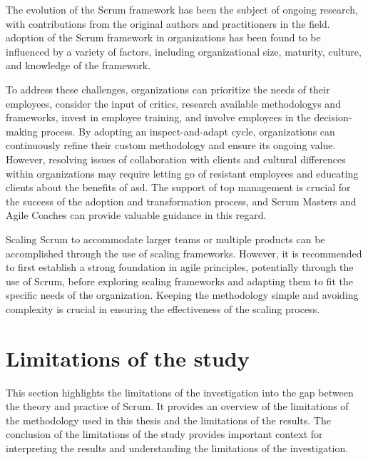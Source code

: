 The evolution of the Scrum \gls{framework} has been the subject of ongoing research, with contributions from the original authors and practitioners in the field. \Gls{adoption} of the Scrum \gls{framework} in organizations has been found to be influenced by a variety of factors, including organizational size, maturity, culture, and knowledge of the \gls{framework}. 

To address these challenges, organizations can prioritize the needs of their employees, consider the input of critics, research available \glspl{methodology} and \glspl{framework}, invest in employee training, and involve employees in the decision-making process. By adopting an inspect-and-adapt cycle, organizations can continuously refine their custom \gls{methodology} and ensure its ongoing value. However, resolving issues of collaboration with \glspl{client} and cultural differences within organizations may require letting go of resistant employees and educating \glspl{client} about the benefits of \ac{asd}. The support of top management is crucial for the success of the \gls{adoption} and \gls{transformation} process, and Scrum Masters and Agile Coaches can provide valuable guidance in this regard.

Scaling Scrum to accommodate larger teams or multiple products can be accomplished through the use of scaling \glspl{framework}. However, it is recommended to first establish a strong foundation in \Gls{agile} \glspl{principle}, potentially through the use of Scrum, before exploring scaling \glspl{framework} and adapting them to fit the specific needs of the organization. Keeping the \gls{methodology} simple and avoiding complexity is crucial in ensuring the effectiveness of the scaling process.

\section{Limitations of the study}\label{sec:Limitationsofthestudy}
This section highlights the limitations of the investigation into the gap between the theory and practice of Scrum. It provides an overview of the limitations of the \gls{methodology} used in this thesis and the limitations of the results. The conclusion of the limitations of the study provides important context for interpreting the results and understanding the limitations of the investigation.

